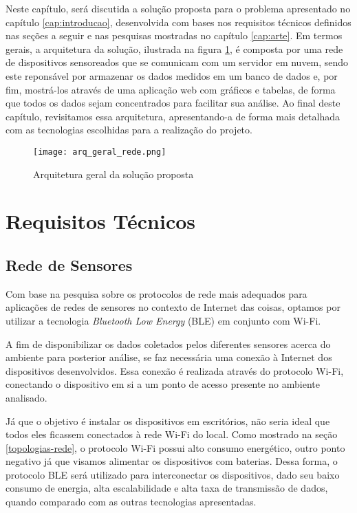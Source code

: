 \documentclass[../monografia.tex]{subfiles}
\begin{document}
Neste capítulo, será discutida a solução proposta para o problema apresentado no capítulo \ref{cap:introducao}, desenvolvida com bases nos requisitos técnicos definidos nas seções a seguir e nas pesquisas mostradas no capítulo \ref{cap:arte}. Em termos gerais, a arquitetura da solução, ilustrada na figura \ref{fig:arquitetura-geral}, é composta por uma rede de dispositivos sensoreados que se comunicam com um servidor em nuvem, sendo este reponsável por armazenar os dados medidos em um banco de dados e, por fim, mostrá-los através de uma aplicação web com gráficos e tabelas, de forma que todos os dados sejam concentrados para facilitar sua análise. Ao final deste capítulo, revisitamos essa arquitetura, apresentando-a de forma mais detalhada com as tecnologias escolhidas para a realização do projeto.

\begin{figure}[ht]
    \centering
    \texttt{[image: arq\_geral\_rede.png]}
    \caption{Arquitetura geral da solução proposta}
    \label{fig:arquitetura-geral}
\end{figure}


\section{Requisitos Técnicos} \label{specs:requisitos}

\subsection{Rede de Sensores}

Com base na pesquisa sobre os protocolos de rede mais adequados para aplicações de redes de sensores no contexto de Internet das coisas, optamos por utilizar a tecnologia \textit{Bluetooth Low Energy} (BLE) em conjunto com Wi-Fi. 

A fim de disponibilizar os dados coletados pelos diferentes sensores acerca do ambiente para posterior análise, se faz necessária uma conexão à Internet dos dispositivos desenvolvidos. Essa conexão é realizada através do protocolo Wi-Fi, conectando o dispositivo em si a um ponto de acesso presente no ambiente analisado.

Já que o objetivo é instalar os dispositivos em escritórios, não seria ideal que todos eles ficassem conectados à rede Wi-Fi do local. Como mostrado na seção \ref{topologias-rede}, o protocolo Wi-Fi possui alto consumo energético, outro ponto negativo já que visamos alimentar os dispositivos com baterias. Dessa forma, o protocolo BLE será utilizado para interconectar os dispositivos, dado seu baixo consumo de energia, alta escalabilidade e alta taxa de transmissão de dados, quando comparado com as outras tecnologias apresentadas.
\end{document}
